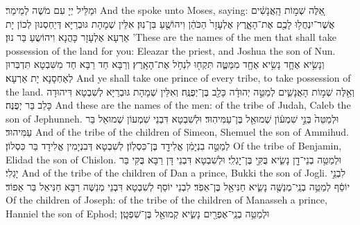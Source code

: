 {וּמַלֵּיל יְיָ עִם מֹשֶׁה לְמֵימַר׃}
{And the \lord\space spoke unto Moses, saying:}{}
{אֵ֚לֶּה שְׁמ֣וֹת הָֽאֲנָשִׁ֔ים אֲשֶׁר־יִנְחֲל֥וּ לָכֶ֖ם אֶת־הָאָ֑רֶץ אֶלְעָזָר֙ הַכֹּהֵ֔ן וִיהוֹשֻׁ֖עַ בִּן־נֽוּן׃
}
{אִלֵּין שְׁמָהָת גּוּבְרַיָּא דְּיַחְסְנוּן לְכוֹן יָת אַרְעָא אֶלְעָזָר כָּהֲנָא וִיהוֹשֻעַ בַּר נוּן׃}
{’These are the names of the men that shall take possession of the land for you: Eleazar the priest, and Joshua the son of Nun.}{}
{וְנָשִׂ֥יא אֶחָ֛ד נָשִׂ֥יא אֶחָ֖ד מִמַּטֶּ֑ה תִּקְח֖וּ לִנְחֹ֥ל אֶת־הָאָֽרֶץ׃
}
{וְרַבָּא חַד רַבָּא חַד מִשִּׁבְטָא תִּדְבְּרוּן לְאַחְסָנָא יָת אַרְעָא׃}
{And ye shall take one prince of every tribe, to take possession of the land.}{}
{וְאֵ֖לֶּה שְׁמ֣וֹת הָאֲנָשִׁ֑ים לְמַטֵּ֣ה יְהוּדָ֔ה כָּלֵ֖ב בֶּן־יְפֻנֶּֽה׃}
{וְאִלֵּין שְׁמָהָת גּוּבְרַיָּא לְשִׁבְטָא דִּיהוּדָה כָּלֵב בַּר יְפֻנֶּה׃}
{And these are the names of the men: of the tribe of Judah, Caleb the son of Jephunneh.}{}
{וּלְמַטֵּה֙ בְּנֵ֣י שִׁמְע֔וֹן שְׁמוּאֵ֖ל בֶּן־עַמִּיהֽוּד׃}
{וּלְשִׁבְטָא דִּבְנֵי שִׁמְעוֹן שְׁמוּאֵל בַּר עַמִּיהוּד׃}
{And of the tribe of the children of Simeon, Shemuel the son of Ammihud.}{}
{לְמַטֵּ֣ה בִנְיָמִ֔ן אֱלִידָ֖ד בֶּן־כִּסְלֽוֹן׃}
{לְשִׁבְטָא דְּבִנְיָמִין אֱלִידָד בַּר כִּסְלוֹן׃}
{Of the tribe of Benjamin, Elidad the son of Chislon.}{}
{וּלְמַטֵּ֥ה בְנֵי־דָ֖ן נָשִׂ֑יא בֻּקִּ֖י בֶּן־יׇגְלִֽי׃}
{וּלְשִׁבְטָא דִּבְנֵי דָּן רַבָּא בֻּקִּי בַּר יָגְלִי׃}
{And of the tribe of the children of Dan a prince, Bukki the son of Jogli.}{}
{לִבְנֵ֣י יוֹסֵ֔ף לְמַטֵּ֥ה בְנֵֽי־מְנַשֶּׁ֖ה נָשִׂ֑יא חַנִּיאֵ֖ל בֶּן־אֵפֹֽד׃}
{לִבְנֵי יוֹסֵף לְשִׁבְטָא דִּבְנֵי מְנַשֶּׁה רַבָּא חַנִּיאֵל בַּר אֵפוֹד׃}
{Of the children of Joseph: of the tribe of the children of Manasseh a prince, Hanniel the son of Ephod;}{}
{וּלְמַטֵּ֥ה בְנֵֽי־אֶפְרַ֖יִם נָשִׂ֑יא קְמוּאֵ֖ל בֶּן־שִׁפְטָֽן׃}
